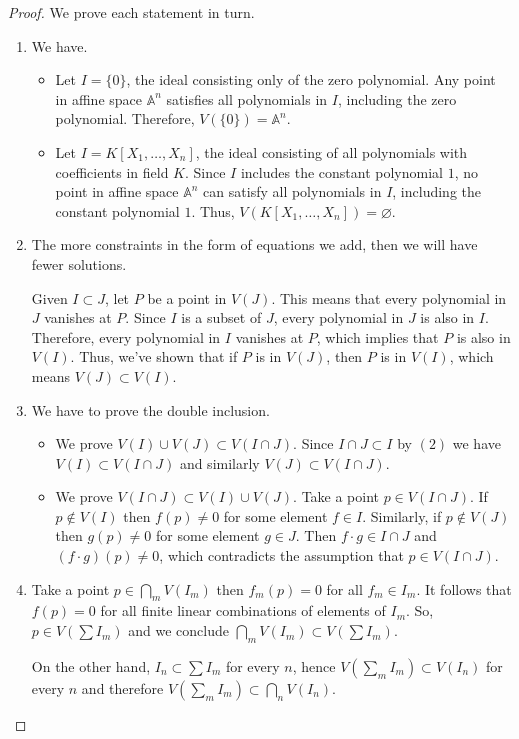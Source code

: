 \documentclass[12pt, a4paper]{article}
\begin{document}
\begin{proof}
    We prove each statement in turn.
    \begin{enumerate}
        \item We have.
        \begin{itemize}
            \item Let \( I = \{0\} \), the ideal consisting only of the zero polynomial. Any point in affine space \( \mathbb{A}^n \) satisfies all polynomials in \( I \), including the zero polynomial. Therefore, \( V(\{0\}) = \mathbb{A}^n \).
            \item Let \( I = K[X_1,\ldots,X_n] \), the ideal consisting of all polynomials with coefficients in field \( K \). Since \( I \) includes the constant polynomial \( 1 \), no point in affine space \( \mathbb{A}^n \) can satisfy all polynomials in \( I \), including the constant polynomial \( 1 \). Thus, \( V(K[X_1,\ldots,X_n]) = \varnothing \).
        \end{itemize}
        \item The more constraints in the form of equations we add, then we will have fewer solutions. 

        Given \( I \subset J \), let \( P \) be a point in \( V(J) \). This means that every polynomial in \( J \) vanishes at \( P \). Since \( I \) is a subset of \( J \), every polynomial in \( J \) is also in \( I \). Therefore, every polynomial in \( I \) vanishes at \( P \), which implies that \( P \) is also in \( V(I) \). Thus, we've shown that if \( P \) is in \( V(J) \), then \( P \) is in \( V(I) \), which means \( V(J) \subset V(I) \).
        \item We have to prove the double inclusion.
        \begin{itemize}
            \item We prove \(V(I)\cup V(J) \subset V(I \cap J)\). Since \(I \cap J \subset I\) by \((2)\) we have \(V(I) \subset V(I\cap J)\) and similarly \(V(J) \subset V(I \cap J)\).
            \item We prove \(V(I \cap J) \subset V(I) \cup V(J)\). Take a point \(p \in V(I \cap J)\). If \(p \not\in V(I)\) then \(f(p)\neq 0\) for some element \(f\in I\). Similarly, if \(p \not\in V(J)\) then \(g(p)\neq 0\) for some element \(g\in J\). Then \(f\cdot g \in I\cap J\) and \((f\cdot g)(p)\neq 0\), which contradicts the assumption that \(p\in V(I\cap J)\).
        \end{itemize}
        \item Take a point \(p \in \bigcap_m V(I_m)\) then \(f_m(p)=0\) for all \(f_m \in I_m\). It follows that \(f(p)=0\) for all finite linear combinations of elements of \(I_m\). So, \(p \in V\left( \sum I_m \right)\) and we conclude \(\bigcap_m V(I_m) \subset V(\sum I_m)\). 
        
        On the other hand, \(I_n \subset \sum I_m\) for every \(n\), hence \(V(\sum_m I_m) \subset V(I_n)\) for every \(n\) and therefore \(V(\sum_m I_m)\subset \bigcap_n V(I_n)\).
    \end{enumerate}
\end{proof}
\end{document}
